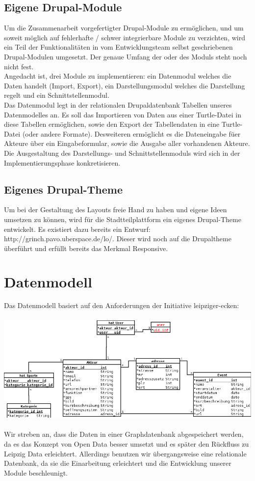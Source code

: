 \documentclass{swp}
\begin{document}
\subsection{Eigene Drupal-Module}
Um die Zusammenarbeit vorgefertigter Drupal-Module zu erm\"oglichen, und um soweit m\"oglich auf fehlerhafte / schwer integrierbare Module zu verzichten, wird ein Teil der Funktionalit\"aten in vom Entwicklungsteam selbst geschriebenen Drupal-Modulen umgesetzt. Der genaue Umfang der oder des Moduls steht noch nicht fest.\\
Angedacht ist, drei Module zu implementieren: ein Datenmodul welches die Daten handelt (Import, Export), ein Darstellungsmodul welches die Darstellung regelt und ein Schnittstellenmodul.\\
Das Datenmodul legt in der relationalen Drupaldatenbank Tabellen unseres Datenmodelles an. Es soll das Importieren von Daten aus einer Turtle-Datei in diese Tabellen erm\"oglichen, sowie den Export der Tabellendaten in eine Turtle-Datei (oder andere Formate). Desweiteren erm\"oglicht es die Dateneingabe f\"uer Akteure \"uber ein Eingabeformular, sowie die Ausgabe aller vorhandenen Akteure.\\
Die Ausgestaltung des Darstellungs- und Schnittstellenmoduls wird sich in der Implementierungsphase konkretisieren.
\subsection{Eigenes Drupal-Theme}
Um bei der Gestaltung des Layouts freie Hand zu haben und eigene Ideen umsetzen zu k\"onnen, wird f\"ur die Stadtteilplattform ein eigenes Drupal-Theme entwickelt. Es existiert dazu bereits ein Entwurf: http://grinch.pavo.uberspace.de/lo/. Dieser wird noch auf die Drupaltheme \"uberf\"uhrt und erf\"ullt bereits das Merkmal \glqq Responsive\grqq{}.
\section{Datenmodell}
Das Datenmodell basiert auf den Anforderungen der Initiative leipziger-ecken:\\\\
\includegraphics[width=\textwidth]{Datenmodell2.png}\\\\
Wir streben an, dass die Daten in einer Graphdatenbank abgespeichert werden, da es das Konzept von Open Data besser umsetzt und es sp\"ater den R\"uckfluss zu Leipzig Data erleichtert. Allerdings benutzen wir \"ubergangsweise eine relationale Datenbank, da sie die Einarbeitung erleichtert und die Entwicklung unserer Module beschleunigt.
\end{document}
